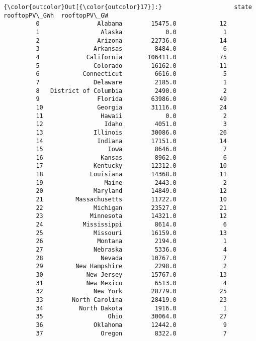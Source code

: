 \documentclass[11pt]{article}
\begin{document}
\begin{Verbatim}[commandchars=\\\{\}]
{\color{outcolor}Out[{\color{outcolor}17}]:}                    state  rooftopPV\_GWh  rooftopPV\_GW
         0                Alabama        15475.0            12
         1                 Alaska            0.0             1
         2                Arizona        22736.0            14
         3               Arkansas         8484.0             6
         4             California       106411.0            75
         5               Colorado        16162.0            11
         6            Connecticut         6616.0             5
         7               Delaware         2185.0             1
         8   District of Columbia         2490.0             2
         9                Florida        63986.0            49
         10               Georgia        31116.0            24
         11                Hawaii            0.0             2
         12                 Idaho         4051.0             3
         13              Illinois        30086.0            26
         14               Indiana        17151.0            14
         15                  Iowa         8646.0             7
         16                Kansas         8962.0             6
         17              Kentucky        12312.0            10
         18             Louisiana        14368.0            11
         19                 Maine         2443.0             2
         20              Maryland        14849.0            12
         21         Massachusetts        11722.0            10
         22              Michigan        23527.0            21
         23             Minnesota        14321.0            12
         24           Mississippi         8614.0             6
         25              Missouri        16159.0            13
         26               Montana         2194.0             1
         27              Nebraska         5336.0             4
         28                Nevada        10767.0             7
         29         New Hampshire         2298.0             2
         30            New Jersey        15767.0            13
         31            New Mexico         6513.0             4
         32              New York        28779.0            25
         33        North Carolina        28419.0            23
         34          North Dakota         1916.0             1
         35                  Ohio        30064.0            27
         36              Oklahoma        12442.0             9
         37                Oregon         8322.0             7

\end{Verbatim}
\end{document}

